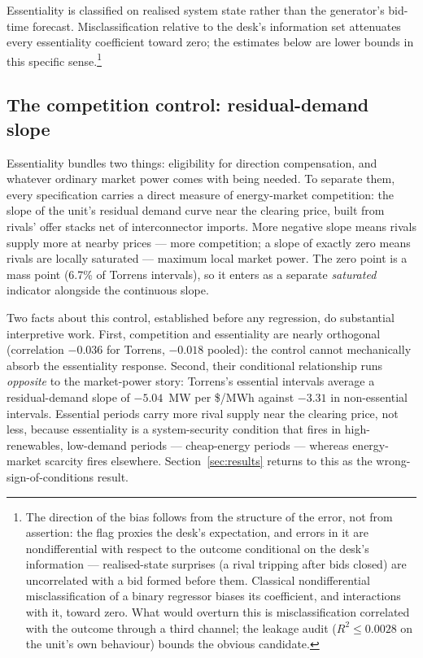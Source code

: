 Essentiality is classified on realised system state rather than the
generator's bid-time forecast. Misclassification relative to the desk's
information set attenuates every essentiality coefficient toward zero; the
estimates below are lower bounds in this specific sense.\footnote{The
direction of the bias follows from the structure of the error, not from
assertion: the flag proxies the desk's expectation, and errors in it are
nondifferential with respect to the outcome conditional on the desk's
information --- realised-state surprises (a rival tripping after bids
closed) are uncorrelated with a bid formed before them. Classical
nondifferential misclassification of a binary regressor biases its
coefficient, and interactions with it, toward zero. What would overturn
this is misclassification correlated with the outcome through a third
channel; the leakage audit ($R^{2}\leq 0.0028$ on the unit's own behaviour)
bounds the obvious candidate.}

\subsection{The competition control: residual-demand slope}

Essentiality bundles two things: eligibility for direction compensation, and
whatever ordinary market power comes with being needed. To separate them, every
specification carries a direct measure of energy-market competition: the slope
of the unit's residual demand curve near the clearing price, built from rivals'
offer stacks net of interconnector imports. More negative slope means rivals
supply more at nearby prices --- more competition; a slope of exactly zero
means rivals are locally saturated --- maximum local market power. The zero
point is a mass point (6.7\% of Torrens intervals), so it enters as a separate
\emph{saturated} indicator alongside the continuous slope.

Two facts about this control, established before any regression, do
substantial interpretive work. First, competition and essentiality are nearly
orthogonal (correlation $-0.036$ for Torrens, $-0.018$ pooled): the control
cannot mechanically absorb the essentiality response. Second, their conditional
relationship runs \emph{opposite} to the market-power story: Torrens's
essential intervals average a residual-demand slope of $-5.04$~MW per \$/MWh
against $-3.31$ in non-essential intervals. Essential periods carry more rival
supply near the clearing price, not less, because essentiality is a
system-security condition that fires in high-renewables, low-demand periods ---
cheap-energy periods --- whereas energy-market scarcity fires elsewhere.
Section~\ref{sec:results} returns to this as the wrong-sign-of-conditions
result.

